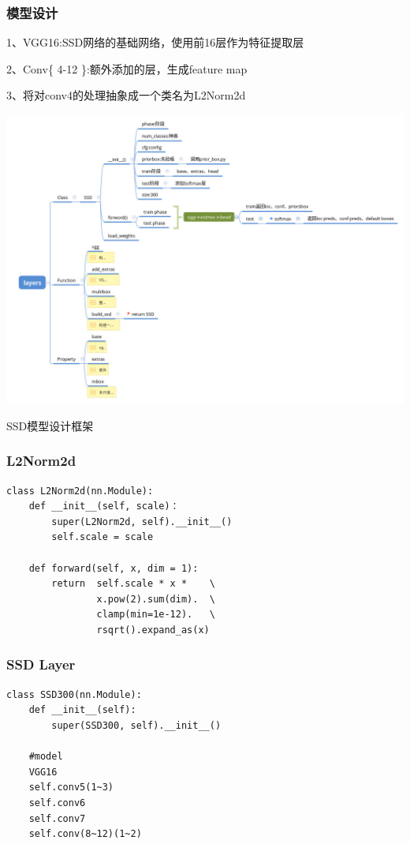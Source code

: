 \subsubsection{模型设计}
1、VGG16:SSD网络的基础网络，使用前16层作为特征提取层

2、Conv\{ 4-12 \}:额外添加的层，生成feature map

3、将对conv4的处理抽象成一个类名为L2Norm2d
\begin{uscfigure}
	\includegraphics[width=\textwidth]{./Pictures/layers.jpg}	
	\caption{SSD模型设计框架}
\end{uscfigure}
\subsubsection{L2Norm2d}
\begin{lstlisting}[caption={L2Norm2d}]
class L2Norm2d(nn.Module):
	def __init__(self, scale)：
		super(L2Norm2d, self).__init__()
		self.scale = scale
		
	def forward(self, x, dim = 1):
		return  self.scale * x *    \
				x.pow(2).sum(dim).  \
				clamp(min=1e-12).	\
				rsqrt().expand_as(x)
\end{lstlisting}
\subsubsection{SSD Layer}
\begin{lstlisting}[caption={SSD layer}]
class SSD300(nn.Module):
	def __init__(self):
		super(SSD300, self).__init__()
	
	#model
	VGG16
	self.conv5(1~3)
	self.conv6
	self.conv7
	self.conv(8~12)(1~2)
\end{lstlisting}

